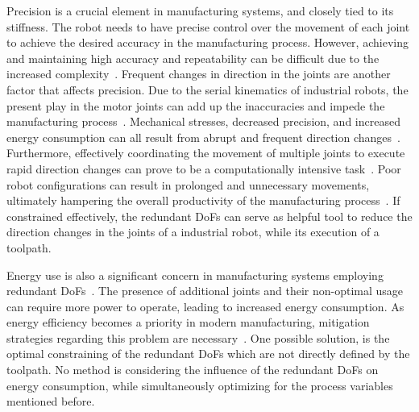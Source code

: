 Precision is a crucial element in manufacturing systems, and closely tied to its stiffness. The robot needs to have precise control over the movement of each joint to achieve the desired accuracy in the manufacturing process. However, achieving and maintaining high accuracy and repeatability can be difficult due to the increased complexity~\cite{Duong.2021}. %
Frequent changes in direction in the joints are another factor that affects precision. 
Due to the serial kinematics of industrial robots, the present play in the motor joints can add up the inaccuracies and impede the manufacturing process~\cite{Huynh.2020, ChenGang.2014}. Mechanical stresses, decreased precision, and increased energy consumption can all result from abrupt and frequent direction changes~\cite{Gasparetto.2010}. Furthermore, effectively coordinating the movement of multiple joints to execute rapid direction changes can prove to be a computationally intensive task~\cite{VandeWeghe.2007}. Poor robot configurations can result in prolonged and unnecessary movements, ultimately hampering the overall productivity of the manufacturing process~\cite{Reiter.2016}. %
If constrained effectively, the redundant \acrshort{DoF}s can serve as helpful tool to reduce the direction changes in the joints of a industrial robot, while its execution of a toolpath. 




Energy use is also a significant concern in manufacturing systems employing redundant \acrshort{DoF}s~\cite{Doan.2016}. The presence of additional joints and their non-optimal usage can require more power to operate, leading to increased energy consumption. As energy efficiency becomes a priority in modern manufacturing, mitigation strategies regarding this problem are necessary~\cite{Boscariol.2020, Boscariol.2019}. One possible solution, is the optimal constraining of the redundant \acrshort{DoF}s which are not directly defined by the toolpath. No method is considering the influence of the redundant \acrshort{DoF}s on energy consumption, while simultaneously optimizing for the process variables mentioned before.

